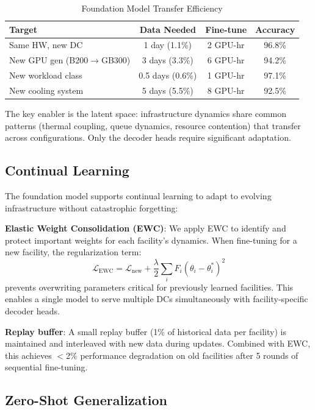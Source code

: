 \documentclass[conference,10pt]{IEEEtran}
\begin{document}
\begin{table}[!htbp]
\caption{Foundation Model Transfer Efficiency}
\label{tab:transfer}
\centering\scriptsize
\begin{tabular}{@{}lccc@{}}
\toprule
\textbf{Target} & \textbf{Data Needed} & \textbf{Fine-tune} & \textbf{Accuracy} \\
\midrule
Same HW, new DC & 1 day (1.1\%) & 2 GPU-hr & 96.8\% \\
New GPU gen (B200$\to$GB300) & 3 days (3.3\%) & 6 GPU-hr & 94.2\% \\
New workload class & 0.5 days (0.6\%) & 1 GPU-hr & 97.1\% \\
New cooling system & 5 days (5.5\%) & 8 GPU-hr & 92.5\% \\
\bottomrule
\end{tabular}
\end{table}

The key enabler is the latent space: infrastructure dynamics share common patterns (thermal coupling, queue dynamics, resource contention) that transfer across configurations. Only the decoder heads require significant adaptation.


\subsection{Continual Learning}

The foundation model supports continual learning to adapt to evolving infrastructure without catastrophic forgetting:

\textbf{Elastic Weight Consolidation (EWC)}: We apply EWC to identify and protect important weights for each facility's dynamics. When fine-tuning for a new facility, the regularization term:
\begin{equation}
\mathcal{L}_{\text{EWC}} = \mathcal{L}_{\text{new}} + \frac{\lambda}{2} \sum_i F_i (\theta_i - \theta_i^*)^2
\end{equation}
prevents overwriting parameters critical for previously learned facilities. This enables a single model to serve multiple DCs simultaneously with facility-specific decoder heads.

\textbf{Replay buffer}: A small replay buffer (1\% of historical data per facility) is maintained and interleaved with new data during updates. Combined with EWC, this achieves $<$2\% performance degradation on old facilities after 5 rounds of sequential fine-tuning.

\subsection{Zero-Shot Generalization}
\end{document}
